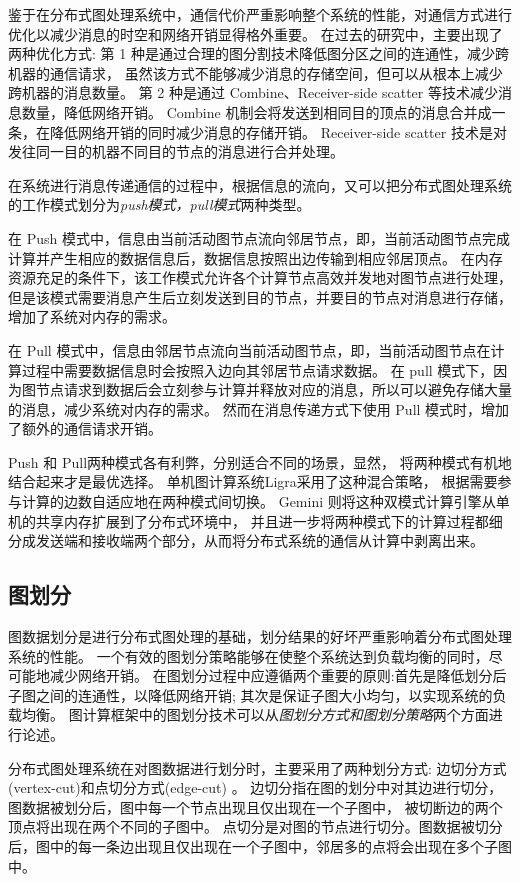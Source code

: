鉴于在分布式图处理系统中，通信代价严重影响整个系统的性能，对通信方式进行优化以减少消息的时空和网络开销显得格外重要。
在过去的研究中，主要出现了两种优化方式:
第 1 种是通过合理的图分割技术降低图分区之间的连通性，减少跨机器的通信请求，
虽然该方式不能够减少消息的存储空间，但可以从根本上减少跨机器的消息数量。
第 2 种是通过 Combine、Receiver-side scatter 等技术减少消息数量，降低网络开销。
Combine 机制会将发送到相同目的顶点的消息合并成一条，在降低网络开销的同时减少消息的存储开销。
Receiver-side scatter 技术是对发往同一目的机器不同目的节点的消息进行合并处理。

在系统进行消息传递通信的过程中，根据信息的流向，又可以把分布式图处理系统的工作模式划分为\textit{push模式，pull模式}两种类型。

在 Push 模式中，信息由当前活动图节点流向邻居节点，即，当前活动图节点完成计算并产生相应的数据信息后，数据信息按照出边传输到相应邻居顶点。
在内存资源充足的条件下，该工作模式允许各个计算节点高效并发地对图节点进行处理，
但是该模式需要消息产生后立刻发送到目的节点，并要目的节点对消息进行存储，增加了系统对内存的需求。

在 Pull 模式中，信息由邻居节点流向当前活动图节点，即，当前活动图节点在计算过程中需要数据信息时会按照入边向其邻居节点请求数据。
在 pull 模式下，因为图节点请求到数据后会立刻参与计算并释放对应的消息，所以可以避免存储大量的消息，减少系统对内存的需求。
然而在消息传递方式下使用 Pull 模式时，增加了额外的通信请求开销。

Push 和 Pull两种模式各有利弊，分别适合不同的场景，显然， 将两种模式有机地结合起来才是最优选择。
单机图计算系统Ligra\cite{Shun@PPoPP13}采用了这种混合策略， 根据需要参与计算的边数自适应地在两种模式间切换。
Gemini\cite{Zhu@OSDI16} 则将这种双模式计算引擎从单机的共享内存扩展到了分布式环境中，
并且进一步将两种模式下的计算过程都细分成发送端和接收端两个部分，从而将分布式系统的通信从计算中剥离出来。

\subsection{图划分}

图数据划分是进行分布式图处理的基础，划分结果的好坏严重影响着分布式图处理系统的性能。
一个有效的图划分策略能够在使整个系统达到负载均衡的同时，尽可能地减少网络开销。
在图划分过程中应遵循两个重要的原则:首先是降低划分后子图之间的连通性，以降低网络开销;
其次是保证子图大小均匀，以实现系统的负载均衡。
图计算框架中的图划分技术可以从\textit{图划分方式和图划分策略}两个方面进行论述。

分布式图处理系统在对图数据进行划分时，主要采用了两种划分方式:
边切分方式(vertex-cut)\cite{Gonzalez@OSDI12}和点切分方式(edge-cut) \cite{Malewicz@SIGMOD10}。
边切分指在图的划分中对其边进行切分，图数据被划分后，图中每一个节点出现且仅出现在一个子图中，
被切断边的两个顶点将出现在两个不同的子图中。
点切分是对图的节点进行切分。图数据被切分后，图中的每一条边出现且仅出现在一个子图中，邻居多的点将会出现在多个子图中。

